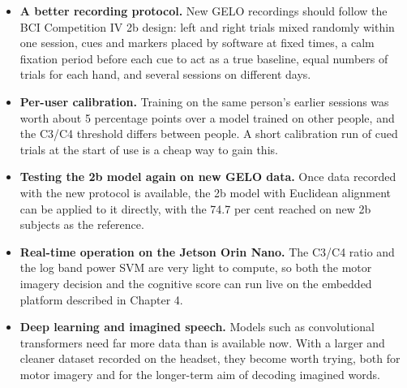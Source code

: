 \begin{itemize}
    \item \textbf{A better recording protocol.} New GELO recordings should follow the BCI
          Competition IV 2b design: left and right trials mixed randomly within one session,
          cues and markers placed by software at fixed times, a calm fixation period before
          each cue to act as a true baseline, equal numbers of trials for each hand, and
          several sessions on different days.
    \item \textbf{Per-user calibration.} Training on the same person's earlier sessions was
          worth about 5 percentage points over a model trained on other people, and the
          C3/C4 threshold differs between people. A short calibration run of cued trials at
          the start of use is a cheap way to gain this.
    \item \textbf{Testing the 2b model again on new GELO data.} Once data recorded with the
          new protocol is available, the 2b model with Euclidean alignment can be applied to
          it directly, with the 74.7 per cent reached on new 2b subjects as the reference.
    \item \textbf{Real-time operation on the Jetson Orin Nano.} The C3/C4 ratio and the log
          band power SVM are very light to compute, so both the motor imagery decision and
          the cognitive score can run live on the embedded platform described in
          Chapter 4.
    \item \textbf{Deep learning and imagined speech.} Models such as convolutional
          transformers need far more data than is available now. With a larger and cleaner
          dataset recorded on the headset, they become worth trying, both for motor imagery
          and for the longer-term aim of decoding imagined words.
\end{itemize}
